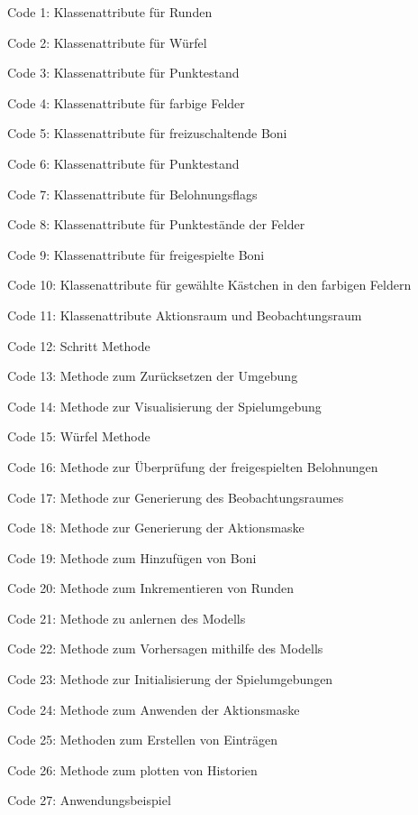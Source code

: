 Code 1: Klassenattribute für Runden

Code 2: Klassenattribute für Würfel

Code 3: Klassenattribute für Punktestand

Code 4: Klassenattribute für farbige Felder

Code 5: Klassenattribute für freizuschaltende Boni

Code 6: Klassenattribute für Punktestand

Code 7: Klassenattribute für Belohnungsflags

Code 8: Klassenattribute für Punktestände der Felder

Code 9: Klassenattribute für freigespielte Boni

Code 10: Klassenattribute für gewählte Kästchen in den farbigen Feldern

Code 11: Klassenattribute Aktionsraum und Beobachtungsraum

Code 12: Schritt Methode

Code 13: Methode zum Zurücksetzen der Umgebung

Code 14: Methode zur Visualisierung der Spielumgebung

Code 15: Würfel Methode

Code 16: Methode zur Überprüfung der freigespielten Belohnungen

Code 17: Methode zur Generierung des Beobachtungsraumes

Code 18: Methode zur Generierung der Aktionsmaske

Code 19: Methode zum Hinzufügen von Boni

Code 20: Methode zum Inkrementieren von Runden

Code 21: Methode zu anlernen des Modells

Code 22: Methode zum Vorhersagen mithilfe des Modells

Code 23: Methode zur Initialisierung der Spielumgebungen

Code 24: Methode zum Anwenden der Aktionsmaske

Code 25: Methoden zum Erstellen von Einträgen

Code 26: Methode zum plotten von Historien

Code 27: Anwendungsbeispiel